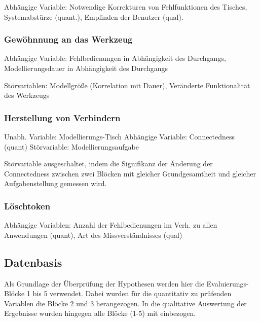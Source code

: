 Abhängige Variable: Notwendige Korrekturen von Fehlfunktionen des Tisches, Systemabstürze (quant.), Empfinden der Benutzer (qual).


\subsubsection{Gewöhnnung an das Werkzeug} %
\label{ssub:gewöhnnung_an_das_werkzeug}

Abhängige Variable: Fehlbedienungen in Abhängigkeit des Durchgangs, Modellierungsdauer in Abhängigkeit des Durchgangs

Störvariablen: Modellgröße (Korrelation mit Dauer), Veränderte Funktionalität des Werkzeugs


\subsubsection{Herstellung von Verbindern} %
\label{ssub:herstellung_von_verbindern}

Unabh. Variable: Modellierungs-Tisch
Abhängige Variable: Connectedness (quant)
Störvariable: Modellierungsaufgabe

Störvariable ausgeschaltet, indem die Signifikanz der Änderung der Connectedness zwischen zwei Blöcken mit gleicher Grundgesamtheit und gleicher Aufgabenstellung gemessen wird.


\subsubsection{Löschtoken} %
\label{ssub:löschtoken}

Abhängige Variablen: Anzahl der Fehlbedienungen im Verh. zu allen Anwendungen (quant), Art des Missverständnisses (qual) 



\subsection{Datenbasis} %
\label{sub:datenbasis}

Als Grundlage der Überprüfung der Hypothesen werden hier die Evaluierungs-Blöcke 1 bis 5 verwendet. Dabei wurden für die quantitativ zu prüfenden Variablen die Blöcke 2 und 3 herangezogen. In die qualitative Auswertung der Ergebnisse wurden hingegen alle Blöcke (1-5) mit einbezogen.

